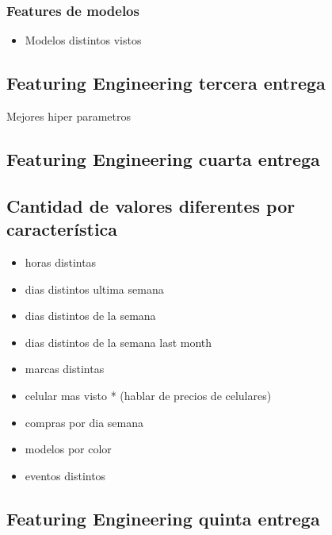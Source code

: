 \documentclass[a4paper ,12pt]{article}
\begin{document}
\subsubsection{Features de modelos}

	\begin{itemize}
		
		\item Modelos distintos vistos
			
	\end{itemize}	

\subsection{Featuring Engineering tercera entrega}

	Mejores hiper parametros

\subsection{Featuring Engineering cuarta entrega}

\subsection{Cantidad de valores diferentes por característica}

\begin{itemize}
	\item horas distintas

	\item dias distintos ultima semana

	\item dias distintos de la semana

	\item dias distintos de la semana last month

	\item marcas distintas

	\item celular mas visto * (hablar de precios de celulares)

	\item compras por dia semana

	\item modelos por color

	\item eventos distintos

\end{itemize}

\newpage
\subsection{Featuring Engineering quinta entrega}
\end{document}
